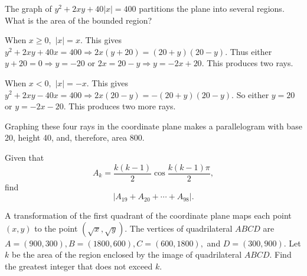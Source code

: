 %	












\begin{question}[name={1998 AIME, \href{https://artofproblemsolving.com/community/c4p392262}{Problem 3}}]
	The graph of $y^2+2xy+40|x|=400$ partitions the plane into several regions. What is the area of the bounded region?
\end{question}


\begin{solution}[name={Solution by joml88}]
	When $x\ge 0,$ $|x|=x.$ This gives $y^2+2xy+40x=400\Rightarrow 2x(y+20)=(20+y)(20-y).$ Thus either $y+20=0\Rightarrow y=-20$ or $2x=20-y\Rightarrow y=-2x+20.$ This produces two rays.
	
	When $x<0,$ $|x|=-x$. This gives $y^2+2xy-40x=400\Rightarrow 2x(20-y)=-(20+y)(20-y).$ So either $y=20$ or $y=-2x-20.$ This produces two more rays.
	
	Graphing these four rays in the coordinate plane makes a parallelogram with base 20, height 40, and, therefore, area 800.
\end{solution}













\begin{question}[name={1998 AIME, \href{https://artofproblemsolving.com/community/c4p392265}{Problem 5}}]
	Given that $$A_k=\frac{k(k-1)}2\cos\frac{k(k-1)\pi}2,$$ find $$|A_{19}+A_{20}+\cdots+A_{98}|.$$
\end{question}

%
%	





\begin{question}[name={1999 AIME, \href{https://artofproblemsolving.com/community/c4p392214}{Problem 6}}]
	A transformation of the first quadrant of the coordinate plane maps each point $(x,y)$ to the point $(\sqrt{x},\sqrt{y}).$ The vertices of quadrilateral $ABCD$ are $A=(900,300), B=(1800,600), C=(600,1800),$ and $D=(300,900).$ Let $k$ be the area of the region enclosed by the image of quadrilateral $ABCD.$ Find the greatest integer that does not exceed $k$.
\end{question}


